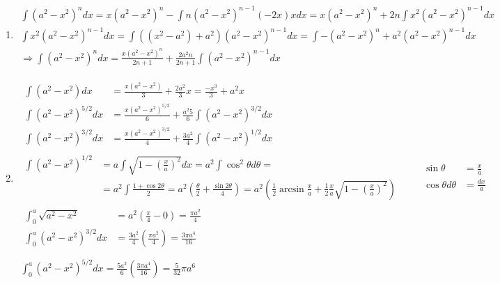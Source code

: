 \documentclass[twoside]{amsart}
\theoremstyle{plain}
\theoremstyle{definition}
\newcommand{\exercisehead}[1]
  {\smallskip
   \noindent{\small\bf Exercise #1.}}
\begin{document}
\exercisehead{15} 
\begin{enumerate}
\item 
\[
\begin{gathered}
  \int (a^2 - x^2 )^n dx  = x(a^2 - x^2)^n - \int n (a^2- x^2)^{n-1} (-2x) x dx = x (a^2 - x^2)^n + 2n \int x^2 ( a^2 - x^2)^{n-1} dx \\
  \int x^2 (a^2 - x^2)^{n-1} dx = \int ( (x^2 - a^2) + a^2)(a^2 - x^2)^{n-1} dx = \int -(a^2-x^2)^n + a^2(a^2- x^2)^{n-1} dx \\
  \Longrightarrow \int (a^2 - x^2)^n dx = \frac{ x(a^2 - x^2)^n }{ 2n+1 } + \frac{ 2a^2 n}{ 2n+1} \int (a^2 - x^2)^{n-1} dx 
\end{gathered}
\]
\item 
\[
\begin{gathered}
  \begin{aligned}
    \int (a^2- x^2) dx & = \frac{ x (a^2- x^2) }{ 3}  + \frac{ 2a^2}{3} x = \frac{ -x^3 }{3} + a^2 x \\
    \int (a^2- x^2)^{5/2} dx & = \frac{ x(a^2 - x^2)^{5/2}}{ 6} + \frac{a^2 5}{6} \int (a^2 - x^2)^{3/2} dx \\
    \int (a^2 - x^2)^{3/2} dx & = \frac{ x (a^2 - x^2)^{3/2} }{ 4 } + \frac{ 3a^2}{4} \int (a^2- x^2 )^{1/2} dx 
\end{aligned} \\
  \begin{aligned}
    \int (a^2 - x^2)^{1/2} & = a \int \sqrt{ 1 - \left( \frac{x}{a} \right)^2 } dx = a^2 \int \cos^2{\theta} d\theta = \\
& = a^2 \int \frac{ 1 + \cos{2\theta}}{ 2 } = a^2 \left( \frac{ \theta}{2} + \frac{ \sin{2\theta}}{4} \right) = a^2 \left( \frac{1}{2}\arcsin{ \frac{x}{a} } + \frac{1}{2} \frac{x}{a} \sqrt{ 1 - \left( \frac{x}{a} \right)^2 } \right) 
\end{aligned} \quad \quad 
  \begin{aligned}
    \sin{\theta} & = \frac{x}{a} \\
    \cos{\theta} d\theta & = \frac{dx}{a} 
\end{aligned} \\
  \begin{aligned}
    \int_0^a \sqrt{ a^2 - x^2 } & = a^2 \left( \frac{ \pi}{4} - 0 \right) = \frac{ \pi a^2}{4} \\
    \int_0^a (a^2 - x^2 )^{3/2} dx & = \frac{3a^2}{4} \left( \frac{ \pi a^2}{4} \right) = \frac{ 3 \pi a^4}{16} \\
 \end{aligned} \\
\boxed{   \int_0^a (a^2 - x^2)^{5/2} dx  = \frac{ 5a^2}{6} \left( \frac{3\pi a^4}{16} \right) = \boxed{ \frac{5}{32} \pi a^6 } }
\end{gathered}
\]
\end{enumerate}
\end{document}
